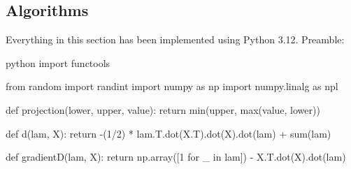 \documentclass[math, info]{cours}
\begin{document}
\subsection{Algorithms}
Everything in this section has been implemented using Python 3.12.
Preamble:
\begin{code}{python}
import functools

from random import randint
import numpy as np
import numpy.linalg as npl


def projection(lower, upper, value):
    return min(upper, max(value, lower))


def d(lam, X):
    return -(1/2) * lam.T.dot(X.T).dot(X).dot(lam) + sum(lam)


def gradientD(lam, X):
    return np.array([1 for _ in lam]) - X.T.dot(X).dot(lam)
\end{code}
\end{document}
